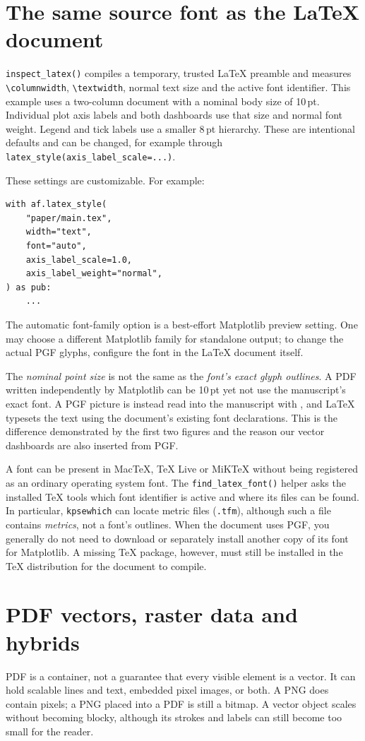 \documentclass[10pt,twocolumn,a4paper]{article}
\begin{document}
\section{The same source font as the LaTeX document}
\texttt{inspect\_latex()} compiles a temporary,
trusted LaTeX preamble and measures
\verb|\columnwidth|, \verb|\textwidth|,
normal text size and the active font identifier.
This example uses a two-column document with a
nominal body size of 10\,pt. Individual plot axis
labels and both dashboards use that size and normal
font weight. Legend and tick labels use a smaller
8\,pt hierarchy. These are intentional defaults
and can be changed, for example through
\texttt{latex\_style(axis\_label\_scale=...)}.

These settings are customizable. For example:
\begin{verbatim}
with af.latex_style(
    "paper/main.tex",
    width="text",
    font="auto",
    axis_label_scale=1.0,
    axis_label_weight="normal",
) as pub:
    ...
\end{verbatim}
The automatic font-family option is a best-effort
Matplotlib preview setting. One may choose a
different Matplotlib family for standalone output;
to change the actual PGF glyphs, configure the
font in the LaTeX document itself.

The \emph{nominal point size} is not the same as the
\emph{font's exact glyph outlines}. A PDF written
independently by Matplotlib can be 10\,pt yet not
use the manuscript's exact font. A PGF picture
is instead read into the manuscript with
\verb||, and LaTeX typesets the text using
the document's existing font declarations.
This is the difference demonstrated by the first
two figures and the reason our vector dashboards
are also inserted from PGF.

A font can be present in MacTeX, TeX Live or MiKTeX
without being registered as an ordinary operating
system font. The \texttt{find\_latex\_font()} helper
asks the installed TeX tools which font identifier
is active and where its files can be found. In
particular, \texttt{kpsewhich} can locate metric
files (\texttt{.tfm}), although such a file
contains \emph{metrics}, not a font's outlines.
When the document uses PGF, you generally do not
need to download or separately install another copy
of its font for Matplotlib. A missing TeX package,
however, must still be installed in the TeX
distribution for the document to compile.

\section{PDF vectors, raster data and hybrids}
PDF is a container, not a guarantee that every
visible element is a vector. It can hold scalable
lines and text, embedded pixel images, or both.
A PNG does contain pixels; a PNG placed into a
PDF is still a bitmap. A vector object scales
without becoming blocky, although its strokes and
labels can still become too small for the reader.
\end{document}
